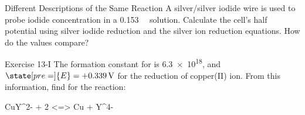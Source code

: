 \documentclass[notes=show]{beamer}
\begin{document}

%

\begin{frame}[t]{Different Descriptions of the Same Reaction}
	A silver/silver iodide wire is used to probe iodide concentration in a
	\SI{0.153}{\milli\Molar}  solution.  Calculate the cell's half
	potential  using silver iodide reduction and the silver ion reduction
	equations.  How do the values compare?

\end{frame}

\clearpage

\begin{frame}[t]{Exercise 13-I}
	The formation constant for  is \num{6.3e18}, and
	$\state[pre=]{E} = \SI[retain-explicit-plus]{+0.339}{\volt}$
	for the reduction of copper(II) ion.  From this information, find
	 for the reaction:
	\begin{reaction*}
		CuY^{2-}  +  2 \el{}  <=>  Cu\sld{}  +  Y^{4-}
	\end{reaction*}

\end{frame}
\end{document}
